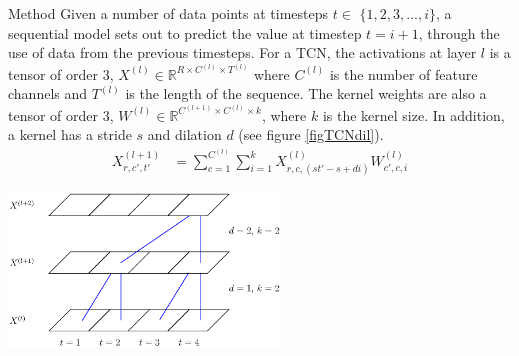 \documentclass[paperwidth=24in,paperheight=48in, fontscale=0.4166666666666]{baposter}
\begin{document}
\begin{poster}
\begin{posterbox}[name=method,column=0,below=background]{Method}
\vspace{-2pt}
Given a number of data points at timesteps $t \in$ $\{1, 2, 3, ..., i\}$, a sequential model sets out to predict the value at timestep $t = i+1$, through the use of data from the previous timesteps. For a TCN, the activations at layer $l$ is a tensor of order 3, $X^{(l)} \in \mathbb{R}^{R \times C^{(l)} \times T^{(l)}}$ where $C^{(l)}$ is the number of feature channels and $T^{(l)}$ is the length of the sequence. The kernel weights are also a tensor of order 3, $W^{(l)} \in \mathbb{R}^{C^{(l+1)} \times C^{(l)} \times k}$, where $k$ is the kernel size. In addition, a kernel has a stride $s$ and dilation $d$ (see figure \ref{figTCNdil}).
\begin{equation}
\begin{split}
	X^{(l+1)}_{r, c', t'}	
		& = \sum^{C^{(l)}}_{c=1} \sum^{k}_{i=1} X^{(l)}_{r, c, (st'-s+di)}W^{(l)}_{c', c, i}
\end{split}
\end{equation}



\begin{center}
\begin{minipage}{0.9\textwidth}
\begin{center}
  \includegraphics[width=7.2cm]{figTCNdil.eps}
  \label{figTCNdil}
\end{center}
\end{minipage}
\end{center}

\end{posterbox}















\end{poster}
\end{document}
